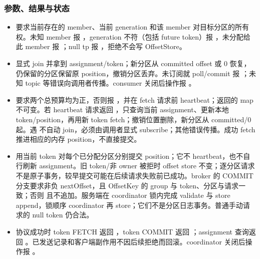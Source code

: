 \subsubsection*{参数、结果与状态}
\begin{itemize}
\item {} 要求当前存在的 member、当前 generation 和该 member 对目标分区的所有权。未知 member 报 ，generation 不符（包括 future token）报 ，未分配给此 member 报 ；null tp 报 ，拒绝不会写 OffsetStore。
\item {} 显式 join 并拿到 assignment/token；新分区从 committed offset 或 0 恢复，仍保留的分区保留原 position，撤销分区丢弃。未订阅就 poll/commit 报 ；未知 topic 等错误向调用者传播。consumer 关闭后操作报 。
\item {} 要求两个总预算均为正，否则报 ，并在 fetch 请求前 heartbeat；返回的 map 不可变。若 heartbeat 请求返回 ，只查询当前 assignment、更新本地 token/position，再用新 token fetch；撤销位置删除，新分区从 committed/0 起。遇  不自动 join，必须由调用者显式 subscribe；其他错误传播。成功 fetch 推进相应的内存 position，不直接提交。
\item {} 用当前 token 对每个已分配分区分别提交 position；它不 heartbeat，也不自行刷新 assignment。旧 token/非 owner 被拒时 offset store 不变；逐分区请求不是原子事务，较早提交可能在后续请求失败前已成功。broker 的 COMMIT 分支要求非负 nextOffset，且 OffsetKey 的 group 与 token、分区与请求一致；否则  且不追加。服务端在 coordinator 锁内完成 validate 与 store append，锁顺序 coordinator 再 store；它们不是分区日志事务。普通手动请求的 null token 仍合法。
\item 协议成功时 token FETCH 返回 ，token COMMIT 返回 ；assignment 查询返回 。已发送记录和客户端副作用不因后续拒绝而回滚。coordinator 关闭后操作报 。
\end{itemize}
